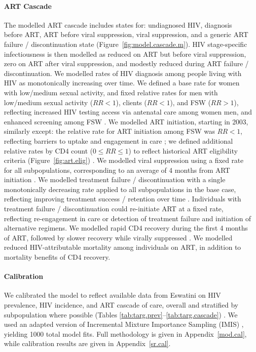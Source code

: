 \paragraph{ART Cascade}
The modelled ART cascade includes states for:
undiagnosed HIV, diagnosis before ART, ART before viral suppression, viral suppression,
and a generic ART failure / discontinuation state
(Figure~\ref{fig:model.cascade.m}).
HIV stage-specific infectiousness is then modelled as
reduced on ART but before viral suppression,
zero on ART after viral suppression, and
modestly reduced during ART failure / discontinuation.
We modelled rates of HIV diagnosis among people living with HIV
as monotonically increasing over time.
We defined a base rate for women with low/medium sexual activity,
and fixed relative rates for
men with low/medium sexual activity ($RR < 1$), clients ($RR < 1$), and FSW ($RR > 1$),
reflecting increased HIV testing access via antenatal care among women \vs men,
and enhanced screening among FSW \cite{Baral2014}.
We modelled ART initiation, starting in 2003, similarly except:
the relative rate for ART initiation among FSW was $RR < 1$,
reflecting barriers to uptake and engagement in care \cite{Lancaster2016sr};
we defined additional relative rates by CD4 count ($0 \le RR \le 1$)
to reflect historical ART eligibility criteria (Figure~\ref{fig:art.elig}) \cite{SHIMS2}.
We modelled viral suppression using a fixed rate for all subpopulations,
corresponding to an average of 4 months from ART initiation \cite{Mujugira2016}.
We modelled treatment failure / discontinuation with a single monotonically decreasing rate
applied to all subpopulations in the base case,
reflecting improving treatment success / retention over time \cite{SHIMS2}.
Individuals with treatment failure / discontinuation could re-initiate ART at a fixed rate,
reflecting re-engagement in care or
detection of treatment failure and initiation of alternative regimens.
We modelled rapid CD4 recovery during the first 4 months of ART,
followed by slower recovery while virally suppressed \cite{Gabillard2013}.
We modelled reduced HIV-attributable mortality among individuals on ART,
in addition to mortality benefits of CD4 recovery.
\paragraph{Calibration}
We calibrated the model to reflect
available data from Eswatini on HIV prevalence, HIV incidence, and ART cascade of care,
overall and stratified by subpopulation where possible
(Tables \ref{tab:targ.prev}--\ref{tab:targ.cascade})
\cite{SDHS2006,SHIMS1,SHIMS2,SHIMS3,Baral2014,EswKP2014,EswIBBS2022}.
We used an adapted version of Incremental Mixture Importance Sampling (IMIS) \cite{Raftery2010},
yielding 1000 total model fits.
Full methodology is given in Appendix~\ref{mod.cal},
while calibration results are given in Appendix~\ref{sr.cal}.
